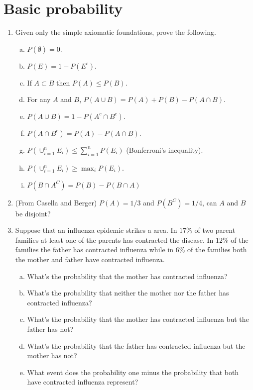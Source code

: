 \documentclass[12pt]{article}
\begin{document}
\section{Basic probability}
\begin{enumerate}[1.]
\item Given only the simple axiomatic foundations, prove the following.
\begin{enumerate}[a.]
\item  $P(\emptyset) = 0$.
\item  $P(E) = 1 - P(E^c)$.
\item  If $A \subset B$ then $P(A) \leq P(B)$.
\item  For any $A$ and $B$, $P(A \cup B) = P(A) + P(B) - P(A \cap B)$.
\item  $P(A \cup B) = 1 - P(A^c \cap B^c)$.
\item   $P(A \cap B^c) = P(A) - P(A \cap B)$. 
\item  $P(\cup_{i=1}^n E_i) \leq \sum_{i=1}^n P(E_i)$ (Bonferroni's inequality).
\item  $P(\cup_{i=1}^n E_i) \geq \max_i P(E_i)$.
\item $P(B\cap A^C) = P(B) - P(B \cap A)$
\end{enumerate}
\item (From Casella and Berger) $P(A) = 1/3$ and $P(B^C) = 1/4$, can $A$ and $B$ be disjoint?
\item Suppose that an influenza epidemic strikes a area. In $17\%$ of
  two parent families at least one of the parents has contracted the
  disease.  In $12\%$ of the families the father has contracted
  influenza while in $6\%$ of the families both the mother and father
  have contracted influenza.
  \begin{enumerate}[a.]
  \item What's the probability that the mother has contracted influenza?
  \item What's the probability that neither the mother nor the father has contracted influenza? 
  \item What's the probability that the mother has contracted influenza but the father has not?
  \item What's the probability that the father has contracted influenza but the mother has not?
  \item What event does the probability one minus the probability that
    both have contracted influenza represent?
  \end{enumerate}
\end{enumerate}
\end{document}
